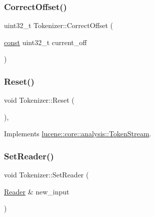 \subsubsection{\texorpdfstring{Correct\+Offset()}{CorrectOffset()}}
{\footnotesize\ttfamily uint32\+\_\+t Tokenizer\+::\+Correct\+Offset (\begin{DoxyParamCaption}\item[{\mbox{\hyperlink{ZlibCrc32_8h_a2c212835823e3c54a8ab6d95c652660e}{const}} uint32\+\_\+t}]{current\+\_\+off }\end{DoxyParamCaption})\hspace{0.3cm}{\ttfamily [protected]}}

\mbox{\label{classlucene_1_1core_1_1analysis_1_1Tokenizer_a459d9c95a28f3b8aa3ad1cfde1568dd3}} 
\subsubsection{\texorpdfstring{Reset()}{Reset()}}
{\footnotesize\ttfamily void Tokenizer\+::\+Reset (\begin{DoxyParamCaption}{ }\end{DoxyParamCaption})\hspace{0.3cm}{\ttfamily [override]}, {\ttfamily [virtual]}}



Implements \mbox{\hyperlink{classlucene_1_1core_1_1analysis_1_1TokenStream_ae24622f4bc0aeaf0bef924ff1661e023}{lucene\+::core\+::analysis\+::\+Token\+Stream}}.

\mbox{\label{classlucene_1_1core_1_1analysis_1_1Tokenizer_a3e5ea6dde1191ef370f42333bda69113}} 
\subsubsection{\texorpdfstring{Set\+Reader()}{SetReader()}}
{\footnotesize\ttfamily void Tokenizer\+::\+Set\+Reader (\begin{DoxyParamCaption}\item[{\mbox{\hyperlink{classlucene_1_1core_1_1analysis_1_1Reader}{Reader}} \&}]{new\+\_\+input }\end{DoxyParamCaption})}

